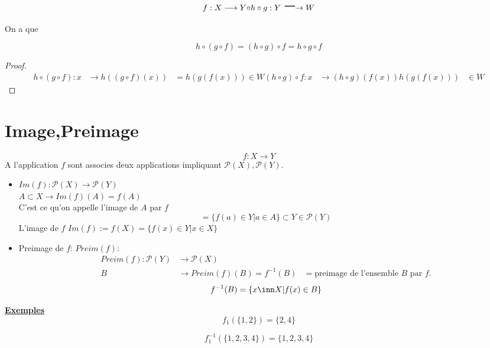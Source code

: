 \documentclass[../main.tex]{subfiles}
\begin{document}
\[ 
	f: X \longrightarrow Y \huge{\circ} h \circ g : Y \longrightarrow W
\]

On a que 

\begin{thm}\label{thm:composition_de_fonctions}
	
\[ 
	h \circ ( g \circ f) = ( h \circ g) \circ f = h \circ g \circ f
\]
\end{thm}
\begin{proof}
	\begin{align*}
		h \circ ( g \circ f) : x &\longrightarrow h((g\circ f) ( x))
	&= h(g(f(x))) \in W
		( h\circ g) \circ f : x &\longrightarrow ( h\circ g) ( f(x))
		h(g(f(x))) &\in W
	\end{align*}



\end{proof}
\section{Image,Preimage}
\[ 
f: X \longrightarrow Y
\]
A l'application $f$ sont associes deux applications impliquant $\mathcal{P}(X), \mathcal{P}(Y)$.
\begin{itemize}
	\item $Im(f): \mathcal{P}(X) \longrightarrow \mathcal{P}(Y)$\\
		$A \subset X  \longrightarrow  Im(f)(A)=f(A)$\\
		C'est ce qu'on appelle l'image de $A$ par $f$ 
		\[ 
			= \{ f(a) \in Y \vert a \in A\} \subset Y \in \mathcal{P}(Y)
		\]
		L'image de $f$ $Im(f) := f(X) = \{f(x) \in Y \vert x \in X\}$

	\item Preimage de  $f$: $Preim(f)$:
		\begin{align*}
			Preim(f): \mathcal{P}(Y) &\longrightarrow \mathcal{P}(X)\\
			B &\longrightarrow Preim(f)(B) = f^{-1}(B)
			  &= \text{preimage de l'ensemble $B$ par $f$.}
		\end{align*}
		\[ 
			f^{-1}(B) = \{x \inn X \vert f(x) \in B\}
		\]
\end{itemize}

\textbf{\underline{Exemples}}\\

\[ 
	f_1(\{1,2\}) = \{2,4\}
\]

\[ 
	f_1^{-1}(\{1,2,3,4\}) = \{1,2,3,4\}
\]
\end{document}
